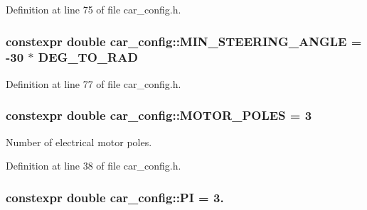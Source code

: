 Definition at line 75 of file car\+\_\+config.\+h.

\subsubsection[{\texorpdfstring{M\+I\+N\+\_\+\+S\+T\+E\+E\+R\+I\+N\+G\+\_\+\+A\+N\+G\+LE}{MIN_STEERING_ANGLE}}]{\setlength{\rightskip}{0pt plus 5cm}constexpr double car\+\_\+config\+::\+M\+I\+N\+\_\+\+S\+T\+E\+E\+R\+I\+N\+G\+\_\+\+A\+N\+G\+LE = -\/30 $\ast$ {\bf D\+E\+G\+\_\+\+T\+O\+\_\+\+R\+AD}}\hypertarget{namespacecar__config_a38229ce5d2e17e0c30b86864fb20d9ce}{}\label{namespacecar__config_a38229ce5d2e17e0c30b86864fb20d9ce}


Definition at line 77 of file car\+\_\+config.\+h.

\subsubsection[{\texorpdfstring{M\+O\+T\+O\+R\+\_\+\+P\+O\+L\+ES}{MOTOR_POLES}}]{\setlength{\rightskip}{0pt plus 5cm}constexpr double car\+\_\+config\+::\+M\+O\+T\+O\+R\+\_\+\+P\+O\+L\+ES = 3}\hypertarget{namespacecar__config_a611a0f02cf52db1d438a2dd53b642cd5}{}\label{namespacecar__config_a611a0f02cf52db1d438a2dd53b642cd5}


Number of electrical motor poles. 



Definition at line 38 of file car\+\_\+config.\+h.

\subsubsection[{\texorpdfstring{PI}{PI}}]{\setlength{\rightskip}{0pt plus 5cm}constexpr double car\+\_\+config\+::\+PI = 3.}\hypertarget{namespacecar__config_a90cb9957197db8924811c447bc98703a}{}\label{namespacecar__config_a90cb9957197db8924811c447bc98703a}


